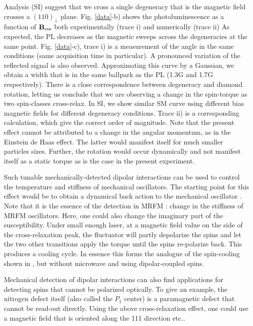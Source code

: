 \documentclass[preprintnumbers,amsmath,amssymb,superscriptaddress,twocolumn,showpacs]{revtex4-1}
\begin{document}
Analysis (SI) suggest that we cross a single degeneracy that is the magnetic field crosses a $(110)_\perp$ plane.
 Fig. \ref{data}-b) shows the photoluminescence as a function of $\bf B_{\rm em}$ both experimentally (trace i) and numerically (trace ii)
As expected, the PL decreases as the magnetic sweeps across the degeneracies at the same point. 
 Fig. \ref{data}-c), trace i) is a measurement of the angle in the same conditions (same acquisition time in particular). 
A pronounced variation of the reflected signal is also observed. Approximating this curve by a Gaussian, we obtain a width that is in the same ballpark as the PL (1.3G and 1.7G respectively).
There is a close correspondence between degeneracy and diamond rotation, letting us conclude that we are observing a change in the spin-torque as two spin-classes cross-relax. 
In SI, we show similar SM curve using different bias magnetic fields for different degeneracy conditions. 
Trace ii) is a corresponding calculation, which give the correct order of magnitude.  
Note that the present effect cannot be attributed to a change in the angular momentum, as in the Einstein de Haas effect. 
The latter would manifest itself for much smaller particles sizes. Further, the rotation would occur dynamically and not manifest itself as a static torque as is the case in the present experiment. 

Such tunable mechanically-detected dipolar interactions can be used to control the temperature and stiffness of mechanical oscillators.
The starting point for this effect would be to obtain a dynamical back action to the mechanical oscillator \cite{aspelmeyer}. 
Note that it is the essence of the detection in MRFM : change in the stiffness of MRFM oscillators. Here, one could also change the imaginary part of the susceptibility.
Under small enough laser, at a magnetic field value on the side of the cross-relaxation peak, the fluctuator will partly depolarize the spins and let the two other transitions apply the torque until the spins re-polarize back. This produces a cooling cycle.  
In essence this forms the analogue of the spin-cooling shown in \cite{DelordNat}, but without microwave and using dipolar-coupled spins.

Mechanical detection of dipolar interactions can also find applications for detecting spins that cannot be polarized optically. 
To give an example, the nitrogen defect itself (also called the $P_1$ center) is a paramagnetic defect that cannot be read-out directly. 
Using the above cross-relaxation effect, one could use a magnetic field that is oriented along the 111 direction etc..
\end{document}
